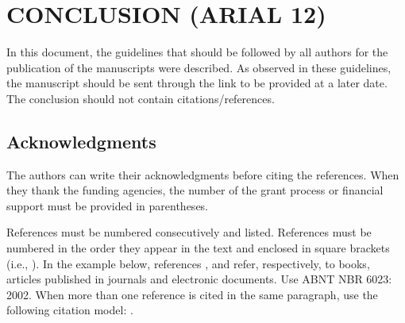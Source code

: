 \documentclass[
	article,			%
	12pt,				%
	oneside,			%
	a4paper,			%
	english,			%
	brazil,				%
	sumario=tradicional
	]{abntex2}
\begin{document}
\section{\textbf{CONCLUSION (ARIAL 12)}}

In this document, the guidelines that should be followed by all authors for the publication of the manuscripts were described. As observed in these guidelines, the manuscript should be sent through the link to be provided at a later date.
The conclusion should not contain citations/references.


\subsection*{\textbf{Acknowledgments}}

The authors can write their acknowledgments before citing the references. When they thank the funding agencies, the number of the grant process or financial support must be provided in parentheses.

References must be numbered consecutively and listed. References must be numbered in the order they appear in the text and enclosed in square brackets (i.e., \cite{gomes1998novela}). In the example below, references \cite{gomes1998novela}, \cite{pinto2005biodiesel} and \cite{silva1998pena} refer, respectively, to books, articles published in journals and electronic documents. Use ABNT NBR 6023: 2002. When more than one reference is cited in the same paragraph, use the following citation model: \cite{gomes1998novela, pinto2005biodiesel}.

\postextual

\vspace*{1.5cm}




\end{document}
